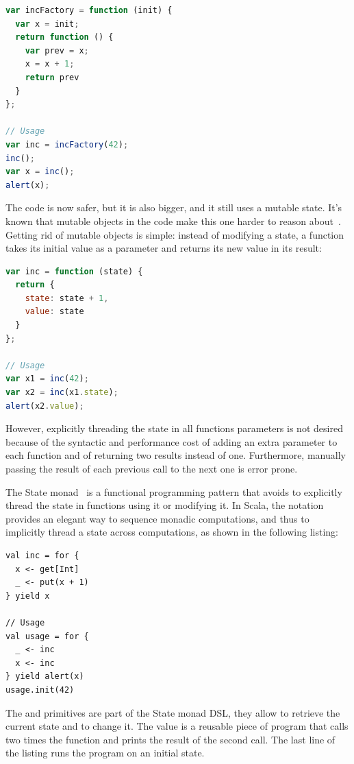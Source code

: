\documentclass[american,english,runningheads]{llncs}
\begin{document}
\begin{lstlisting}[language=JavaScript,label=state-encapsulated,caption=State encapsulation within a function]
var incFactory = function (init) {
  var x = init;
  return function () {
    var prev = x;
    x = x + 1;
    return prev
  }
};

// Usage
var inc = incFactory(42);
inc();
var x = inc();
alert(x);
\end{lstlisting}

The code is now safer, but it is also bigger, and it still uses a mutable state. It’s known that mutable objects in the code make this one harder to reason about~\cite{Grogono94_Immutability,Kjolstad11_Immutability}. Getting rid of mutable objects is simple: instead of modifying a state, a function takes its initial value as a parameter and returns its new value in its result:

\begin{lstlisting}[language=JavaScript,label=state-explicit,caption=Explicit state threading]
var inc = function (state) {
  return {
    state: state + 1,
    value: state
  }
};

// Usage
var x1 = inc(42);
var x2 = inc(x1.state);
alert(x2.value);
\end{lstlisting}

However, explicitly threading the state in all functions parameters is not desired because of the syntactic and performance cost of adding an extra parameter to each function and of returning two results instead of one. Furthermore, manually passing the result of each previous call to the next one is error prone.

The State monad~\cite{Wadler92_StateM} is a functional programming pattern that avoids to explicitly thread the state in functions using it or modifying it. In Scala, the  notation provides an elegant way to sequence monadic computations, and thus to implicitly thread a state across computations, as shown in the following listing:

\begin{lstlisting}[label=state-monad,caption=Implicitly threaded state using the State Monad]
val inc = for {
  x <- get[Int]
  _ <- put(x + 1)
} yield x

// Usage
val usage = for {
  _ <- inc
  x <- inc
} yield alert(x)
usage.init(42)
\end{lstlisting}

The  and  primitives are part of the State monad DSL, they allow to retrieve the current state and to change it. The  value is a reusable piece of program that calls two times the  function and prints the result of the second call. The last line of the listing runs the  program on an initial state.
\end{document}

